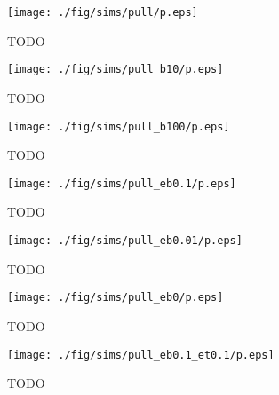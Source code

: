 	\begin{figure}[h]
		\begin{center}
			\texttt{[image: ./fig/sims/pull/p.eps]}
		\end{center}		
		\caption{ TODO
		\label{fig:PullGrid}}
	\end{figure}
	
	\begin{figure}[h]
		\begin{center}
			\texttt{[image: ./fig/sims/pull\_b10/p.eps]}
		\end{center}		
		\caption{ TODO
		\label{fig:PullGrid:b10}}
	\end{figure}
	
	\begin{figure}[h]
		\begin{center}
			\texttt{[image: ./fig/sims/pull\_b100/p.eps]}
		\end{center}		
		\caption{ TODO
		\label{fig:PullGrid:b100}}
	\end{figure}
	
	\begin{figure}[h]
		\begin{center}
			\texttt{[image: ./fig/sims/pull\_eb0.1/p.eps]}
		\end{center}		
		\caption{ TODO
		\label{fig:PullGrid:eb0.1}}
	\end{figure}

	\begin{figure}[h]
		\begin{center}
			\texttt{[image: ./fig/sims/pull\_eb0.01/p.eps]}
		\end{center}		
		\caption{ TODO
		\label{fig:PullGrid:eb0.01}}
	\end{figure}
	
	\begin{figure}[h]
		\begin{center}
			\texttt{[image: ./fig/sims/pull\_eb0/p.eps]}
		\end{center}		
		\caption{ TODO
		\label{fig:PullGrid:eb0}}
	\end{figure}
	
	\begin{figure}[h]
		\begin{center}
			\texttt{[image: ./fig/sims/pull\_eb0.1\_et0.1/p.eps]}
		\end{center}		
		\caption{ TODO
		\label{fig:PullGrid:eb0.1_et0.1}}
	\end{figure}
	

